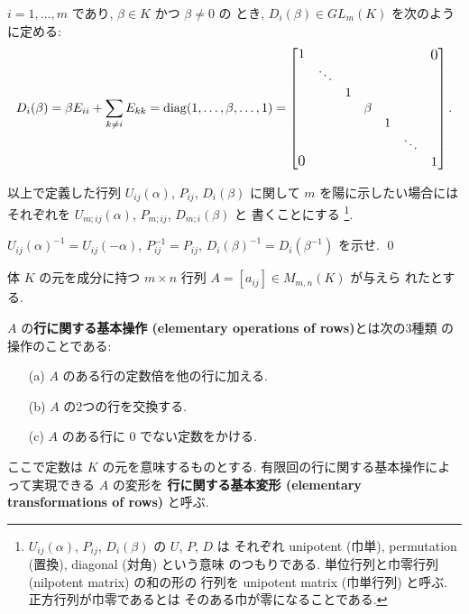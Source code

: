 \documentclass[12pt,twoside]{jarticle}
\begin{document}
$i=1,\ldots,m$ であり,  $\beta\in K$ かつ $\beta\ne 0$ の
とき, $D_i(\beta)\in GL_m(K)$ を次のように定める:
\begin{equation*}
  D_i(\beta) = \beta E_{ii} + \sum_{k\ne i} E_{kk} 
  = \diag(1,\ldots,\beta,\ldots,1) =
  \begin{bmatrix}
    1 &        &   &       &   & & \bigzerou \\
      & \ddots &   &       &   & & \\
      &        & 1 &       &   & & \\
      &        &   & \beta &   & & \\
      &        &   &       & 1 & & \\
      &        &   &       &   & \ddots & \\
    \bigzerol & &  &       &   &        & 1 \\
  \end{bmatrix}.
\end{equation*}

以上で定義した行列 $U_{ij}(\alpha)$, $P_{ij}$, $D_i(\beta)$ 
に関して $m$ を陽に示したい場合には
それぞれを $U_{m;ij}(\alpha)$, $P_{m;ij}$, $D_{m;i}(\beta)$ と
書くことにする%
\footnote{$U_{ij}(\alpha)$, $P_{ij}$, $D_i(\beta)$ の $U$, $P$, $D$ は
  それぞれ unipotent (巾単), permutation (置換), diagonal (対角) という意味
  のつもりである. 単位行列と巾零行列 (nilpotent matrix) の和の形の
  行列を unipotent matrix (巾単行列) と呼ぶ.  正方行列が巾零であるとは
  そのある巾が零になることである.}.

\begin{question}
  \label{q:inv-U,P,D}
  $U_{ij}(\alpha)^{-1}=U_{ij}(-\alpha)$, 
  $P_{ij}^{-1}=P_{ij}$, 
  $D_i(\beta)^{-1}=D_i(\beta^{-1})$ を示せ. 
  \qed
\end{question}


体 $K$ の元を成分に持つ $m\times n$ 行列 $A=[a_{ij}]\in M_{m,n}(K)$ が与えら
れたとする.

$A$ の{\bf 行に関する基本操作 (elementary operations of rows)}とは次の3種類
の操作のことである:
\begin{enumerate}
\item[(a)] $A$ のある行の定数倍を他の行に加える.
\item[(b)] $A$ の2つの行を交換する.
\item[(c)] $A$ のある行に $0$ でない定数をかける.
\end{enumerate}
ここで定数は $K$ の元を意味するものとする.
有限回の行に関する基本操作によって実現できる $A$ の変形を
{\bf 行に関する基本変形 (elementary transformations of rows)} と呼ぶ.
\end{document}
